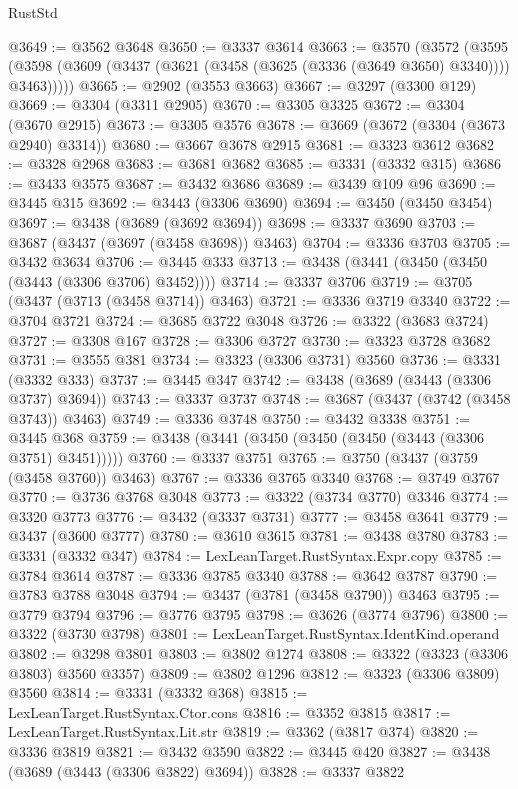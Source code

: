 \begin{lexlean}{RustStd}
\begin{coremodule}
@3649 := @3562 @3648
@3650 := @3337 @3614
@3663 := @3570
    (@3572
      (@3595 (@3598 (@3609 (@3437 (@3621 (@3458 (@3625 (@3336 (@3649 @3650) @3340)))) @3463)))))
@3665 := @2902 (@3553 @3663)
@3667 := @3297 (@3300 @129)
@3669 := @3304 (@3311 @2905)
@3670 := @3305 @3325
@3672 := @3304 (@3670 @2915)
@3673 := @3305 @3576
@3678 := @3669 (@3672 (@3304 (@3673 @2940) @3314))
@3680 := @3667 @3678 @2915
@3681 := @3323 @3612
@3682 := @3328 @2968
@3683 := @3681 @3682
@3685 := @3331 (@3332 @315)
@3686 := @3433 @3575
@3687 := @3432 @3686
@3689 := @3439 @109 @96
@3690 := @3445 @315
@3692 := @3443 (@3306 @3690)
@3694 := @3450 (@3450 @3454)
@3697 := @3438 (@3689 (@3692 @3694))
@3698 := @3337 @3690
@3703 := @3687 (@3437 (@3697 (@3458 @3698)) @3463)
@3704 := @3336 @3703
@3705 := @3432 @3634
@3706 := @3445 @333
@3713 := @3438 (@3441 (@3450 (@3450 (@3443 (@3306 @3706) @3452))))
@3714 := @3337 @3706
@3719 := @3705 (@3437 (@3713 (@3458 @3714)) @3463)
@3721 := @3336 @3719 @3340
@3722 := @3704 @3721
@3724 := @3685 @3722 @3048
@3726 := @3322 (@3683 @3724)
@3727 := @3308 @167
@3728 := @3306 @3727
@3730 := @3323 @3728 @3682
@3731 := @3555 @381
@3734 := @3323 (@3306 @3731) @3560
@3736 := @3331 (@3332 @333)
@3737 := @3445 @347
@3742 := @3438 (@3689 (@3443 (@3306 @3737) @3694))
@3743 := @3337 @3737
@3748 := @3687 (@3437 (@3742 (@3458 @3743)) @3463)
@3749 := @3336 @3748
@3750 := @3432 @3338
@3751 := @3445 @368
@3759 := @3438 (@3441 (@3450 (@3450 (@3450 (@3443 (@3306 @3751) @3451)))))
@3760 := @3337 @3751
@3765 := @3750 (@3437 (@3759 (@3458 @3760)) @3463)
@3767 := @3336 @3765 @3340
@3768 := @3749 @3767
@3770 := @3736 @3768 @3048
@3773 := @3322 (@3734 @3770) @3346
@3774 := @3320 @3773
@3776 := @3432 (@3337 @3731)
@3777 := @3458 @3641
@3779 := @3437 (@3600 @3777)
@3780 := @3610 @3615
@3781 := @3438 @3780
@3783 := @3331 (@3332 @347)
@3784 := LexLeanTarget.RustSyntax.Expr.copy
@3785 := @3784 @3614
@3787 := @3336 @3785 @3340
@3788 := @3642 @3787
@3790 := @3783 @3788 @3048
@3794 := @3437 (@3781 (@3458 @3790)) @3463
@3795 := @3779 @3794
@3796 := @3776 @3795
@3798 := @3626 (@3774 @3796)
@3800 := @3322 (@3730 @3798)
@3801 := LexLeanTarget.RustSyntax.IdentKind.operand
@3802 := @3298 @3801
@3803 := @3802 @1274
@3808 := @3322 (@3323 (@3306 @3803) @3560 @3357)
@3809 := @3802 @1296
@3812 := @3323 (@3306 @3809) @3560
@3814 := @3331 (@3332 @368)
@3815 := LexLeanTarget.RustSyntax.Ctor.cons
@3816 := @3352 @3815
@3817 := LexLeanTarget.RustSyntax.Lit.str
@3819 := @3362 (@3817 @374)
@3820 := @3336 @3819
@3821 := @3432 @3590
@3822 := @3445 @420
@3827 := @3438 (@3689 (@3443 (@3306 @3822) @3694))
@3828 := @3337 @3822

\end{coremodule}
\end{lexlean}
